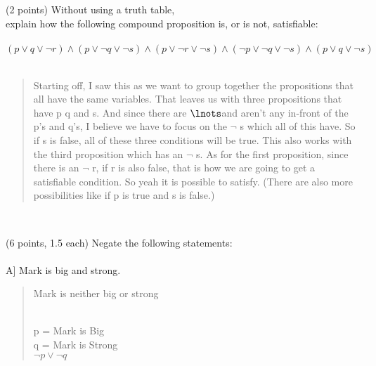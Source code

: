 \documentclass[9pt]{article}
\begin{document}
\\ \\
\vspace{10mm}
\newpage
\vspace{5mm}
\item (2 points) Without using a truth table,\\
explain how the following compound proposition is, or is not, satisfiable:\\
\\
$(p\lor q\lor \lnot r)\land(p\lor\lnot q\lor\lnot s)\land(p\lor\lnot r\lor\lnot s)
\land(\lnot p\lor \lnot q\lor\lnot s)\land(p\lor q\lor\lnot s)$
\\
\\
\begin{quote}
	Starting off, I saw this as we want to group together the propositions that all have the same variables. That leaves us with three propositions that have p q and s. And since there are $\lnots $and aren't any in-front of the p's and q's, I believe we have to focus on the $\lnot$ s which all of this have. So if s is false, all of these three conditions will be true. This also works with the third proposition which has an $\lnot$ s. As for the first proposition, since there is an $\lnot$ r, if r is also false, that is how we are going to get a satisfiable condition. So yeah it is possible to satisfy. (There are also more possibilities like if p is true  and s is false.)
\end{quote}
\\
\vspace{10mm}
\newpage
\vspace{5mm}
\item (6 points, 1.5 each) Negate the following statements:\\
\\
A] Mark is big and strong.\\
\begin{quote}
	Mark is neither big or strong
	
	\\
	
	p = Mark is Big \\ 
	q = Mark is Strong \\
	$\lnot p \lor \lnot q $\\ 
	
\end{quote}
\end{document}
